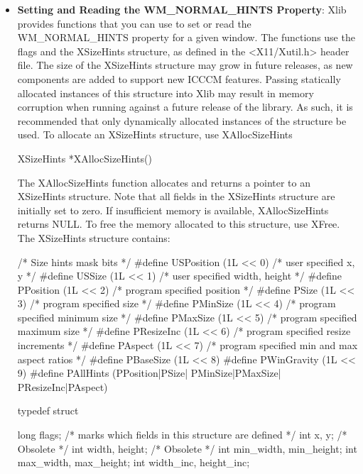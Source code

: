 \documentclass{report}
\begin{document}
\begin{itemize}
\begin{itemize}
            \bigbreak \noindent 
            XGetWMHints can generate a BadWindow error.
        \item \textbf{Setting and Reading the WM\_NORMAL\_HINTS Property}: Xlib provides functions that you can use to set or read the WM\_NORMAL\_HINTS property for a given window. The functions use the flags and the XSizeHints structure, as defined in the <X11/Xutil.h> header file.
            \bigbreak \noindent 
            The size of the XSizeHints structure may grow in future releases, as new components are added to support new ICCCM features. Passing statically allocated instances of this structure into Xlib may result in memory corruption when running against a future release of the library. As such, it is recommended that only dynamically allocated instances of the structure be used.
            \bigbreak \noindent 
            To allocate an XSizeHints structure, use XAllocSizeHints
            \bigbreak \noindent 
            \begin{cppcode}
                XSizeHints *XAllocSizeHints()
            \end{cppcode}
            \bigbreak \noindent 
            The XAllocSizeHints function allocates and returns a pointer to an XSizeHints structure. Note that all fields in the XSizeHints structure are initially set to zero. If insufficient memory is available, XAllocSizeHints returns NULL. To free the memory allocated to this structure, use XFree.
            \bigbreak \noindent 
            The XSizeHints structure contains:
            \bigbreak \noindent 
            \begin{cppcode}
                /* Size hints mask bits */
                #define USPosition      (1L << 0)       /* user specified x, y */
                #define USSize          (1L << 1)       /* user specified width, height */
                #define PPosition       (1L << 2)       /* program specified position */
                #define PSize           (1L << 3)       /* program specified size */
                #define PMinSize        (1L << 4)       /* program specified minimum size */
                #define PMaxSize        (1L << 5)       /* program specified maximum size */
                #define PResizeInc      (1L << 6)       /* program specified resize increments */
                #define PAspect         (1L << 7)       /* program specified min and max aspect ratios */
                #define PBaseSize       (1L << 8)
                #define PWinGravity     (1L << 9)
                #define PAllHints   (PPosition|PSize| PMinSize|PMaxSize| PResizeInc|PAspect)
            \end{cppcode}
            \bigbreak \noindent 
            \begin{cppcode}
                typedef struct {
                    long flags;                     /* marks which fields in this structure are defined */
                    int x, y;                       /* Obsolete */
                    int width, height;              /* Obsolete */
                    int min_width, min_height;
                    int max_width, max_height;
                    int width_inc, height_inc;

}
\end{cppcode}
\end{itemize}
\end{itemize}
\end{document}
